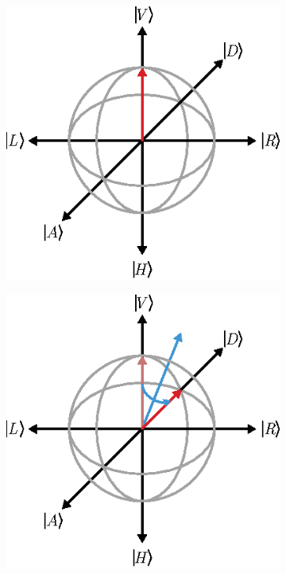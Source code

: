 \documentclass[PaulGanssle-Thesis.tex]{subfiles}
\begin{document}
\begin{figure}[ht!]
\centering
\begin{subfigure}[h]{0.3\tw}
\includegraphics[width=\tw]{figures/magnetometer/PC-Step1.eps}
\caption{}
\label{fig:PEMPCStep1}
\end{subfigure}
\begin{subfigure}[h]{0.3\tw}
\includegraphics[width=\tw]{figures/magnetometer/PC-Step2.eps}
\caption{}
\label{fig:PEMPCStep2}
\end{subfigure}
\begin{subfigure}[h]{0.3\tw}

\end{subfigure}
\end{figure}
\end{document}

